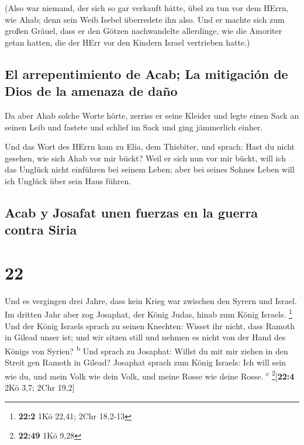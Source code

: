  (Also war niemand, der sich so gar verkauft hätte, übel
zu tun vor dem HErrn, wie Ahab; denn sein Weib Isebel überredete ihn
also.  Und er machte sich zum großen Gräuel, dass er den
Götzen nachwandelte allerdinge, wie die Amoriter getan hatten, die der
HErr vor den Kindern Israel vertrieben hatte.)

\hypertarget{el-arrepentimiento-de-acab-la-mitigaciuxf3n-de-dios-de-la-amenaza-de-dauxf1o}{%
\subsection{El arrepentimiento de Acab; La mitigación de Dios de la
amenaza de
daño}\label{el-arrepentimiento-de-acab-la-mitigaciuxf3n-de-dios-de-la-amenaza-de-dauxf1o}}

 Da aber Ahab solche Worte hörte, zerriss er seine
Kleider und legte einen Sack an seinen Leib und fastete und schlief im
Sack und ging jämmerlich einher.

 Und das Wort des HErrn kam zu Elia, dem Thisbiter, und
sprach:  Hast du nicht gesehen, wie sich Ahab vor mir
bückt? Weil er sich nun vor mir bückt, will ich das Unglück nicht
einführen bei seinem Leben; aber bei seines Sohnes Leben will ich
Unglück über sein Haus führen.

\hypertarget{acab-y-josafat-unen-fuerzas-en-la-guerra-contra-siria}{%
\subsection{Acab y Josafat unen fuerzas en la guerra contra
Siria}\label{acab-y-josafat-unen-fuerzas-en-la-guerra-contra-siria}}

\hypertarget{section-21}{%
\section{22}\label{section-21}}

 Und es vergingen drei Jahre, dass kein Krieg war zwischen
den Syrern und Israel.  Im dritten Jahr aber zog Josaphat,
der König Judas, hinab zum König Israels. \footnote{\textbf{22:2} 1Kö
  22,41; 2Chr 18,2-13}  Und der König Israels sprach zu
seinen Knechten: Wisset ihr nicht, dass Ramoth in Gilead unser ist; und
wir sitzen still und nehmen es nicht von der Hand des Königs von Syrien?
\textsuperscript{b}  Und sprach zu Josaphat: Willst du mit
mir ziehen in den Streit gen Ramoth in Gilead? Josaphat sprach zum König
Israels: Ich will sein wie du, und mein Volk wie dein Volk, und meine
Rosse wie deine Rosse. \textsuperscript{c} \footnote{\textbf{22:49} 1Kö
  9,28}{[}\textbf{22:4} 2Kö 3,7; 2Chr 19,2{]}

